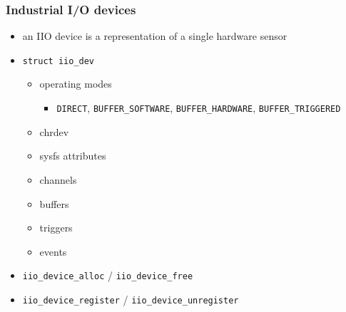 \documentclass[aspectratio=169]{beamer}
\begin{document}
\begin{frame}
\frametitle{Industrial I/O devices}
\begin{itemize}
    \item an IIO device is a representation of a single hardware sensor
    \item \texttt{struct iio\_dev}
    \begin{itemize}
        \item operating modes
        \begin{itemize}
        \item \texttt{DIRECT}, \texttt{BUFFER\_SOFTWARE}, \texttt{BUFFER\_HARDWARE}, \texttt{BUFFER\_TRIGGERED}
        \end{itemize}
        \item chrdev
        \item sysfs attributes
        \item channels
        \item buffers
        \item triggers
        \item events
    \end{itemize}
    \item \texttt{iio\_device\_alloc} / \texttt{iio\_device\_free}
    \item \texttt{iio\_device\_register} / \texttt{iio\_device\_unregister}
\end{itemize}
\end{frame}
\end{document}
